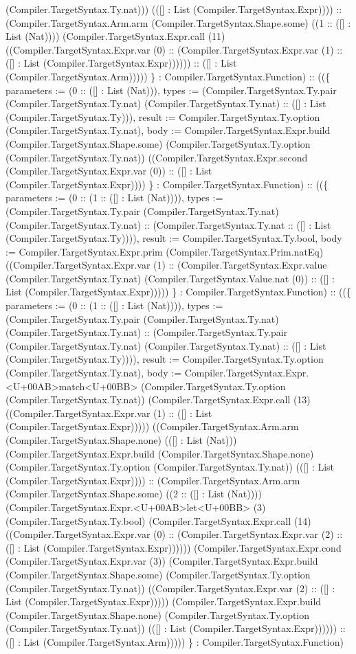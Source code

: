 \documentclass[11pt]{article}
\begin{document}
(Compiler.TargetSyntax.Ty.nat))) (([] : List (Compiler.TargetSyntax.Expr)))) :: (Compiler.TargetSyntax.Arm.arm (Compiler.TargetSyntax.Shape.some) ((1 :: ([] : List (Nat)))) (Compiler.TargetSyntax.Expr.call (11) ((Compiler.TargetSyntax.Expr.var (0) :: (Compiler.TargetSyntax.Expr.var (1) :: ([] : List (Compiler.TargetSyntax.Expr)))))) :: ([] : List (Compiler.TargetSyntax.Arm))))) \} : Compiler.TargetSyntax.Function) :: ((\{ parameters := (0 :: ([] : List (Nat))), types := (Compiler.TargetSyntax.Ty.pair (Compiler.TargetSyntax.Ty.nat) (Compiler.TargetSyntax.Ty.nat) :: ([] : List (Compiler.TargetSyntax.Ty))), result := Compiler.TargetSyntax.Ty.option (Compiler.TargetSyntax.Ty.nat), body := Compiler.TargetSyntax.Expr.build (Compiler.TargetSyntax.Shape.some) (Compiler.TargetSyntax.Ty.option (Compiler.TargetSyntax.Ty.nat)) ((Compiler.TargetSyntax.Expr.second (Compiler.TargetSyntax.Expr.var (0)) :: ([] : List (Compiler.TargetSyntax.Expr)))) \} : Compiler.TargetSyntax.Function) :: ((\{ parameters := (0 :: (1 :: ([] : List (Nat)))), types := (Compiler.TargetSyntax.Ty.pair (Compiler.TargetSyntax.Ty.nat) (Compiler.TargetSyntax.Ty.nat) :: (Compiler.TargetSyntax.Ty.nat :: ([] : List (Compiler.TargetSyntax.Ty)))), result := Compiler.TargetSyntax.Ty.bool, body := Compiler.TargetSyntax.Expr.prim (Compiler.TargetSyntax.Prim.natEq) ((Compiler.TargetSyntax.Expr.var (1) :: (Compiler.TargetSyntax.Expr.value (Compiler.TargetSyntax.Ty.nat) (Compiler.TargetSyntax.Value.nat (0)) :: ([] : List (Compiler.TargetSyntax.Expr))))) \} : Compiler.TargetSyntax.Function) :: ((\{ parameters := (0 :: (1 :: ([] : List (Nat)))), types := (Compiler.TargetSyntax.Ty.pair (Compiler.TargetSyntax.Ty.nat) (Compiler.TargetSyntax.Ty.nat) :: (Compiler.TargetSyntax.Ty.pair (Compiler.TargetSyntax.Ty.nat) (Compiler.TargetSyntax.Ty.nat) :: ([] : List (Compiler.TargetSyntax.Ty)))), result := Compiler.TargetSyntax.Ty.option (Compiler.TargetSyntax.Ty.nat), body := Compiler.TargetSyntax.Expr.<U+00AB>match<U+00BB> (Compiler.TargetSyntax.Ty.option (Compiler.TargetSyntax.Ty.nat)) (Compiler.TargetSyntax.Expr.call (13) ((Compiler.TargetSyntax.Expr.var (1) :: ([] : List (Compiler.TargetSyntax.Expr))))) ((Compiler.TargetSyntax.Arm.arm (Compiler.TargetSyntax.Shape.none) (([] : List (Nat))) (Compiler.TargetSyntax.Expr.build (Compiler.TargetSyntax.Shape.none) (Compiler.TargetSyntax.Ty.option (Compiler.TargetSyntax.Ty.nat)) (([] : List (Compiler.TargetSyntax.Expr)))) :: (Compiler.TargetSyntax.Arm.arm (Compiler.TargetSyntax.Shape.some) ((2 :: ([] : List (Nat)))) (Compiler.TargetSyntax.Expr.<U+00AB>let<U+00BB> (3) (Compiler.TargetSyntax.Ty.bool) (Compiler.TargetSyntax.Expr.call (14) ((Compiler.TargetSyntax.Expr.var (0) :: (Compiler.TargetSyntax.Expr.var (2) :: ([] : List (Compiler.TargetSyntax.Expr)))))) (Compiler.TargetSyntax.Expr.cond (Compiler.TargetSyntax.Expr.var (3)) (Compiler.TargetSyntax.Expr.build (Compiler.TargetSyntax.Shape.some) (Compiler.TargetSyntax.Ty.option (Compiler.TargetSyntax.Ty.nat)) ((Compiler.TargetSyntax.Expr.var (2) :: ([] : List (Compiler.TargetSyntax.Expr))))) (Compiler.TargetSyntax.Expr.build (Compiler.TargetSyntax.Shape.none) (Compiler.TargetSyntax.Ty.option (Compiler.TargetSyntax.Ty.nat)) (([] : List (Compiler.TargetSyntax.Expr)))))) :: ([] : List (Compiler.TargetSyntax.Arm))))) \} : Compiler.TargetSyntax.Function) 
\end{document}
